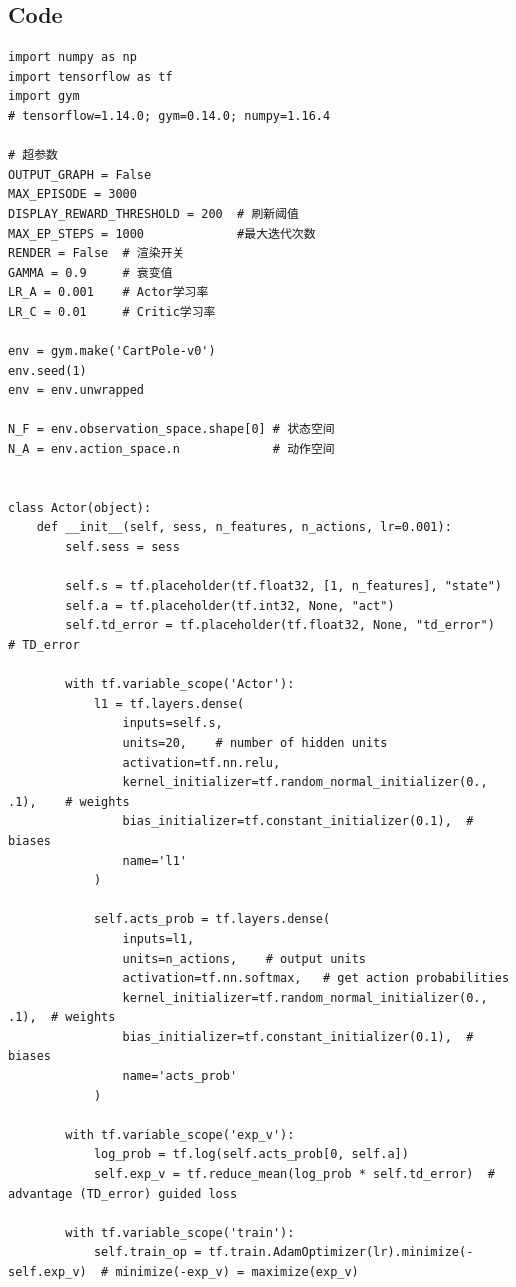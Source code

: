 \documentclass{book}
\begin{document}
\subsection{Code}
\begin{lstlisting}
import numpy as np
import tensorflow as tf
import gym
# tensorflow=1.14.0; gym=0.14.0; numpy=1.16.4 

# 超参数
OUTPUT_GRAPH = False
MAX_EPISODE = 3000
DISPLAY_REWARD_THRESHOLD = 200  # 刷新阈值
MAX_EP_STEPS = 1000             #最大迭代次数
RENDER = False  # 渲染开关
GAMMA = 0.9     # 衰变值
LR_A = 0.001    # Actor学习率
LR_C = 0.01     # Critic学习率

env = gym.make('CartPole-v0')
env.seed(1)  
env = env.unwrapped

N_F = env.observation_space.shape[0] # 状态空间
N_A = env.action_space.n             # 动作空间


class Actor(object):
    def __init__(self, sess, n_features, n_actions, lr=0.001):
        self.sess = sess

        self.s = tf.placeholder(tf.float32, [1, n_features], "state")
        self.a = tf.placeholder(tf.int32, None, "act")
        self.td_error = tf.placeholder(tf.float32, None, "td_error")  # TD_error

        with tf.variable_scope('Actor'):
            l1 = tf.layers.dense(
                inputs=self.s,
                units=20,    # number of hidden units
                activation=tf.nn.relu,
                kernel_initializer=tf.random_normal_initializer(0., .1),    # weights
                bias_initializer=tf.constant_initializer(0.1),  # biases
                name='l1'
            )

            self.acts_prob = tf.layers.dense(
                inputs=l1,
                units=n_actions,    # output units
                activation=tf.nn.softmax,   # get action probabilities
                kernel_initializer=tf.random_normal_initializer(0., .1),  # weights
                bias_initializer=tf.constant_initializer(0.1),  # biases
                name='acts_prob'
            )

        with tf.variable_scope('exp_v'):
            log_prob = tf.log(self.acts_prob[0, self.a])
            self.exp_v = tf.reduce_mean(log_prob * self.td_error)  # advantage (TD_error) guided loss

        with tf.variable_scope('train'):
            self.train_op = tf.train.AdamOptimizer(lr).minimize(-self.exp_v)  # minimize(-exp_v) = maximize(exp_v)


\end{lstlisting}
\end{document}
